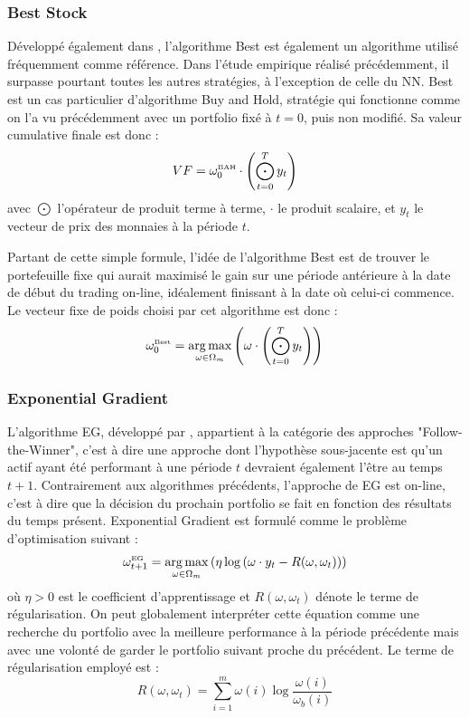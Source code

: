 \documentclass[a4paper, 10pt]{article}
\DeclareMathOperator*{\argmax}{arg\,max}
\begin{document}
\subsubsection{Best Stock}
\label{sec:theorie_best}

Développé également dans \cite{Cover1991}, l'algorithme Best est également un algorithme utilisé fréquemment comme référence. Dans l'étude empirique réalisé précédemment, il surpasse pourtant toutes les autres stratégies, à l'exception de celle du NN. Best est un cas particulier d'algorithme Buy and Hold, stratégie qui fonctionne comme on l'a vu précédemment avec un portfolio fixé à $t=0$, puis non modifié. Sa valeur cumulative finale est donc :
\begin{equation}
    VF = \omega_0^{\text{\tiny BAH}} \cdot \left( \bigodot_{t=0}^{T} y_t \right)
\end{equation}
avec $\bigodot$ l'opérateur de produit terme à terme, $\cdot$ le produit scalaire, et $y_t$ le vecteur de prix des monnaies à la période $t$.

Partant de cette simple formule, l'idée de l'algorithme Best est de trouver le portefeuille fixe qui aurait maximisé le gain sur une période antérieure à la date de début du trading on-line, idéalement finissant à la date où celui-ci commence. Le vecteur fixe de poids choisi par cet algorithme est donc :
\begin{equation}
    \omega_0^{\text{\tiny Best}} = \argmax_{\omega \in \Omega_m} \left( \omega \cdot \left(\bigodot_{t=0}^{T} y_t \right)\right)
\end{equation}

\subsubsection{Exponential Gradient}
\label{sec:theorie_etude_eg}

L'algorithme EG, développé par \citet{Helmbold1998}, appartient à la catégorie des approches "Follow-the-Winner", c'est à dire une approche dont l'hypothèse sous-jacente est qu'un actif ayant été performant à une période $t$ devraient également l'être au temps $t+1$. Contrairement aux algorithmes précédents, l'approche de EG est on-line, c'est à dire que la décision du prochain portfolio se fait en fonction des résultats du temps présent. Exponential Gradient est formulé comme le problème d'optimisation suivant :
\begin{equation}
    \omega_{t+1}^{\text{\tiny EG}} = \argmax_{\omega \in \Omega_m} \left( \eta \log \left(\omega \cdot y_t - R(\omega, \omega_t) \right) \right)
\end{equation}
où $\eta > 0$ est le coefficient d'apprentissage et $R(\omega, \omega_t)$ dénote le terme de régularisation. On peut globalement interpréter cette équation comme une recherche du portfolio avec la meilleure performance à la période précédente mais avec une volonté de garder le portfolio suivant proche du précédent. Le terme de régularisation employé est : 
\begin{equation}
    R(\omega, \omega_t) = \sum_{i=1}^{m} \omega(i) \log \frac{\omega(i)}{\omega_{b}(i)}
\end{equation}
\end{document}
